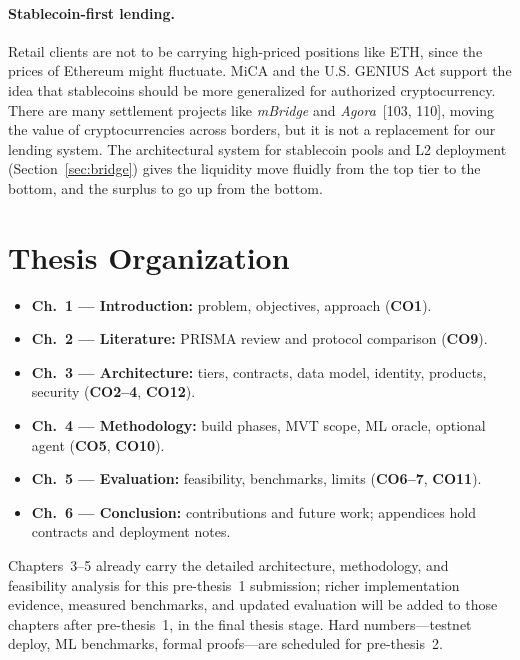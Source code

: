 \documentclass[12pt, a4paper]{report}
\begin{document}
\paragraph{Stablecoin-first lending.}
\label{sec:stablecoin-first}
Retail clients are not to be carrying high-priced positions like ETH, since the prices of Ethereum might fluctuate. MiCA and the U.S. GENIUS Act support the idea that stablecoins should be more generalized for authorized cryptocurrency. There are many settlement projects like \textit{mBridge} and \textit{Agora}~[103, 110], moving the value of cryptocurrencies across borders, but it is not a replacement for our lending system. The architectural system for stablecoin pools and L2 deployment (Section~\ref{sec:bridge}) gives the liquidity move fluidly from the top tier to the bottom, and the surplus to go up from the bottom.

\section{Thesis Organization}
\label{sec:thesis-organization}

\begin{itemize}[noitemsep]
\item \textbf{Ch.~1 --- Introduction:} problem, objectives, approach (\textbf{CO1}).
\item \textbf{Ch.~2 --- Literature:} PRISMA review and protocol comparison (\textbf{CO9}).
\item \textbf{Ch.~3 --- Architecture:} tiers, contracts, data model, identity, products, security (\textbf{CO2--4}, \textbf{CO12}).
\item \textbf{Ch.~4 --- Methodology:} build phases, MVT scope, ML oracle, optional agent (\textbf{CO5}, \textbf{CO10}).
\item \textbf{Ch.~5 --- Evaluation:} feasibility, benchmarks, limits (\textbf{CO6--7}, \textbf{CO11}).
\item \textbf{Ch.~6 --- Conclusion:} contributions and future work; appendices hold contracts and deployment notes.
\end{itemize}

\noindent Chapters~3--5 already carry the detailed architecture, methodology, and feasibility analysis for this pre-thesis~1 submission; richer implementation evidence, measured benchmarks, and updated evaluation will be added to those chapters after pre-thesis~1, in the final thesis stage. Hard numbers---testnet deploy, ML benchmarks, formal proofs---are scheduled for pre-thesis~2.
\end{document}
